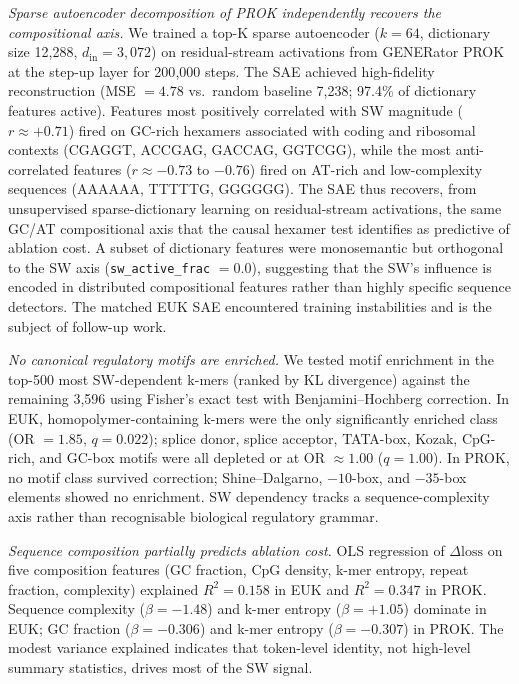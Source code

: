 \documentclass[11pt]{article}
\begin{document}
\textit{Sparse autoencoder decomposition of PROK independently
recovers the compositional axis.}
We trained a top-K sparse autoencoder ($k = 64$, dictionary size
12{,}288, $d_{\text{in}} = 3{,}072$) on residual-stream activations
from GENERator PROK at the step-up layer for 200{,}000 steps. The
SAE achieved high-fidelity reconstruction (MSE $= 4.78$ vs.\ random
baseline 7{,}238; 97.4\% of dictionary features active). Features
most positively correlated with SW magnitude ($r \approx {+}0.71$)
fired on GC-rich hexamers associated with coding and ribosomal
contexts (CGAGGT, ACCGAG, GACCAG, GGTCGG), while the most
anti-correlated features ($r \approx -0.73$ to $-0.76$) fired on
AT-rich and low-complexity sequences (AAAAAA, TTTTTG, GGGGGG). The
SAE thus recovers, from unsupervised sparse-dictionary learning on
residual-stream activations, the same GC/AT compositional axis that
the causal hexamer test identifies as predictive of ablation cost.
A subset of dictionary features were monosemantic but orthogonal to
the SW axis (\texttt{sw\_active\_frac} $= 0.0$), suggesting that the
SW's influence is encoded in distributed compositional features
rather than highly specific sequence detectors. The matched EUK SAE
encountered training instabilities and is the subject of follow-up
work.

\textit{No canonical regulatory motifs are enriched.}
We tested motif enrichment in the top-500 most SW-dependent k-mers
(ranked by KL divergence) against the remaining 3{,}596 using
Fisher's exact test with Benjamini--Hochberg correction. In EUK,
homopolymer-containing k-mers were the only significantly enriched
class (OR $= 1.85$, $q = 0.022$); splice donor, splice acceptor,
TATA-box, Kozak, CpG-rich, and GC-box motifs were all depleted or
at OR $\approx 1.00$ ($q = 1.00$). In PROK, no motif class survived
correction; Shine--Dalgarno, $-10$-box, and $-35$-box elements
showed no enrichment. SW dependency tracks a sequence-complexity
axis rather than recognisable biological regulatory grammar.

\textit{Sequence composition partially predicts ablation cost.}
OLS regression of $\Delta\mathrm{loss}$ on five composition features
(GC fraction, CpG density, k-mer entropy, repeat fraction,
complexity) explained $R^2 = 0.158$ in EUK and $R^2 = 0.347$ in
PROK. Sequence complexity ($\beta = -1.48$) and k-mer entropy
($\beta = +1.05$) dominate in EUK; GC fraction ($\beta = -0.306$)
and k-mer entropy ($\beta = -0.307$) in PROK. The modest variance
explained indicates that token-level identity, not high-level
summary statistics, drives most of the SW signal.
\end{document}
